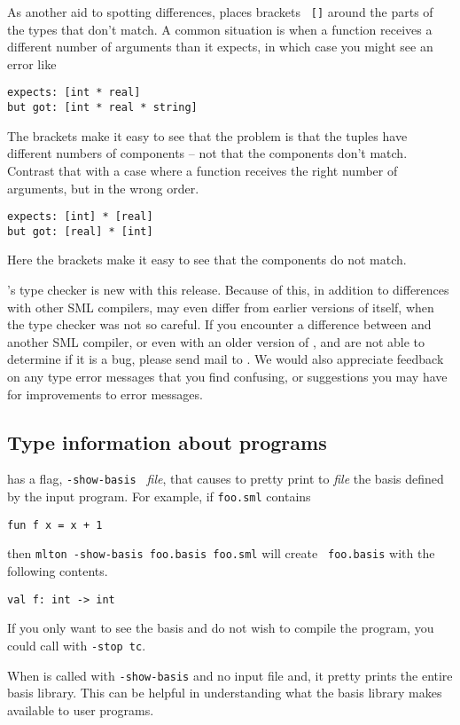 As another aid to spotting differences, {\mlton} places brackets {\tt
[]} around the parts of the types that don't match.  A common
situation is when a function receives a different number of arguments
than it expects, in which case you might see an error like
\begin{verbatim}
expects: [int * real]
but got: [int * real * string]
\end{verbatim}
The brackets make it easy to see that the problem is that the tuples
have different numbers of components -- not that the components don't
match.  Contrast that with a case where a function receives the right
number of arguments, but in the wrong order.
\begin{verbatim}
expects: [int] * [real]
but got: [real] * [int]
\end{verbatim}
Here the brackets make it easy to see that the components do not
match.

{\mlton}'s type checker is new with this release.  Because of this, in
addition to differences with other SML compilers, {\mlton} may even
differ from earlier versions of itself, when the type checker was not
so careful.  If you encounter a difference between {\mlton} and
another SML compiler, or even with an older version of {\mlton}, and
are not able to determine if it is a bug, please send mail to
{\mltonmail}.  We would also appreciate feedback on any type error
messages that you find confusing, or suggestions you may have for
improvements to error messages.

\subsection{Type information about programs}

{\mlton} has a flag, {\tt -show-basis } {\it file}, that causes
{\mlton} to pretty print to {\it file} the basis defined by the input
program.  For example, if {\tt foo.sml} contains
\begin{verbatim}
fun f x = x + 1
\end{verbatim}
then {\tt mlton -show-basis foo.basis foo.sml} will create {\tt
foo.basis} with the following contents.
\begin{verbatim}
val f: int -> int
\end{verbatim}
If you only want to see the basis and do not wish to compile the
program, you could call {\mlton} with {\tt -stop tc}.

When {\mlton} is called with {\tt -show-basis} and no input file and,
it pretty prints the entire basis library.  This can be helpful in
understanding what the basis library makes available to user programs.


